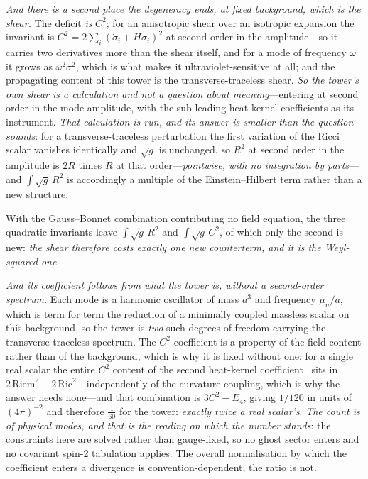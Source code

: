 \documentclass[11pt,a4paper]{article}
\theoremstyle{plain}
\theoremstyle{definition}
\theoremstyle{remark}
\begin{document}
\emph{And there is a second place the degeneracy ends, at fixed background, which is the shear.}
The deficit \emph{is} $C^{2}$; for an anisotropic shear over an isotropic expansion the invariant is
$C^{2}=2\sum_{i}(\dot\sigma_{i}+H\sigma_{i})^{2}$ at second order in the
amplitude---so it carries two
derivatives more than the shear itself, and for a mode of frequency $\omega$ it grows as
$\omega^{2}\sigma^{2}$, which is what makes it ultraviolet-sensitive at all; and the propagating
content of this tower is the transverse-traceless shear. \emph{So the tower's own shear is a calculation and
not a question about meaning}---entering at second order in the mode amplitude, with the sub-leading
heat-kernel coefficients as its instrument. \emph{That calculation is run, and its answer is smaller
than the question sounds}: for a transverse-traceless perturbation the first variation of the Ricci
scalar vanishes identically and $\sqrt g$ is unchanged, so $R^{2}$ at second order in the amplitude is
$2\bar R$ times $R$ at that order---\emph{pointwise, with no integration by parts}---and
$\int\!\sqrt g\,R^{2}$ is accordingly a multiple of the Einstein--Hilbert term rather than a new
structure. 

With the Gauss--Bonnet combination contributing no field equation, the three quadratic
invariants leave $\int\!\sqrt g\,R^{2}$ and $\int\!\sqrt g\,C^{2}$, of which only the second is
new: \emph{the shear therefore costs exactly one new counterterm, and it is the Weyl-squared
one}.

\emph{And its coefficient follows from what the tower is, without a second-order spectrum.} Each mode
is a harmonic oscillator of mass $a^{3}$ and frequency $\mu_{n}/a$, which is term for term the
reduction of a minimally coupled massless scalar on this background, so the tower is \emph{two} such
degrees of freedom carrying the transverse-traceless spectrum. The $C^{2}$ coefficient is a property of
the field content rather than of the background, which is why it is fixed without one: for a single real
scalar the entire $C^{2}$ content of the second heat-kernel coefficient~\cite{Gilkey1975} sits in
$2\,\mathrm{Riem}^{2}-2\,\mathrm{Ric}^{2}$---independently of the curvature coupling, which is why the
answer needs none---and that combination is $3C^{2}-E_{4}$, giving $1/120$ in units of $(4\pi)^{-2}$ and
therefore $\tfrac{1}{60}$ for the
tower: \emph{exactly twice a real scalar's}.
\emph{The count is of physical modes, and that is the reading on which the number stands}: the
constraints here are solved rather than gauge-fixed, so no ghost sector enters and no covariant spin-2
tabulation applies. The overall normalisation by which the coefficient enters a divergence is
convention-dependent; the ratio is not.
\end{document}
